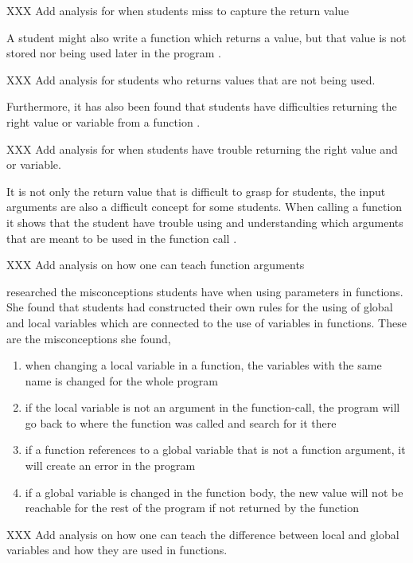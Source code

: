 XXX Add analysis for when students miss to capture the return value


A student might also write a function which returns a value, but that value 
is 
not stored nor being used later in the program 
\parencite{AltadmriBrown2015}. 

XXX Add analysis for students who returns values that are not being used. 


Furthermore, it has also been found that students have difficulties 
returning the right value or variable from a function 
\parencite{KumarVeerasamy2016}. 

XXX Add analysis for when students have trouble returning the right value 
and or variable. 

It is not only the return value that is difficult to grasp for students, the 
input arguments are also a difficult concept for some students. When 
calling a 
function it shows that the student have trouble using and understanding 
which 
arguments that are meant to be used in the function call 
\parencite{AltadmriBrown2015}. 

XXX Add analysis on how one can teach function arguments 

\Textcite{Fleury1991} researched the 
misconceptions students have when using parameters in functions.
She found that students had constructed their own rules for the using 
of global and local variables which are connected to the use of variables in 
functions. These are the misconceptions she found, 

\begin{enumerate}
    \item when changing a local variable in a function, the variables with 
the same name is changed for the whole program

    \item if the local variable is not an argument in the function-call, 
the program will go back to where the function was called and search 
for it there

    \item if a function references to a global variable that is not a 
function argument, it will create an error in the program

    \item if a global variable is changed in the function body, the new 
value will not be reachable for the rest of the program if not returned 
by the function
\end{enumerate}

XXX Add analysis on how one can teach the difference between local and 
global variables and how they are used in functions. 

